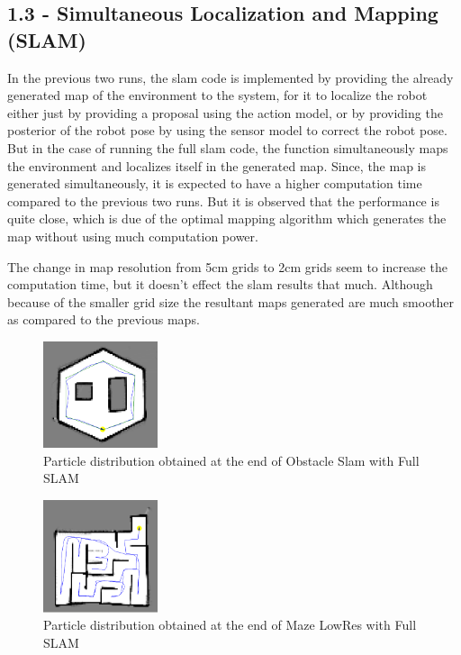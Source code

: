 \documentclass[journal,onecolumn]{IEEEtran}
\begin{document}
\subsection*{1.3 - Simultaneous Localization and Mapping (SLAM)} 

In the previous two runs, the slam code is implemented by providing the already generated map of the environment to the system, for it to localize the robot either just by providing a proposal using the action model, or by providing the posterior of the robot pose by using the sensor model to correct the robot pose. But in the case of running the full slam code, the function simultaneously maps the environment and localizes itself in the generated map. Since, the map is generated simultaneously, it is expected to have a higher computation time compared to the previous two runs. But it is observed that the performance is quite close, which is due of the optimal mapping algorithm which generates the map without using much computation power. 

The change in map resolution from 5cm grids to 2cm grids seem to increase the computation time, but it doesn't effect the slam results that much. Although because of the smaller grid size the resultant maps generated are much smoother as compared to the previous maps.


\begin{figure}[H]
\centering
\includegraphics[width=0.3\textwidth]{Media/131.png}
\caption{Particle distribution obtained at the end of Obstacle Slam with Full SLAM}
\end{figure}

\begin{figure}[H]
\centering
\includegraphics[width=0.3\textwidth]{Media/132.png}
\caption{Particle distribution obtained at the end of Maze LowRes with Full SLAM}
\end{figure}
\end{document}
